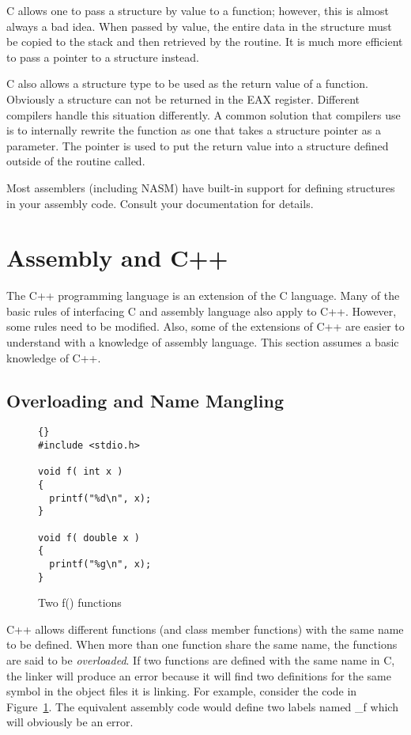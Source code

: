 C allows one to pass a structure by value to a function; however, this is
almost always a bad idea. When passed by value, the entire data in the
structure must be copied to the stack and then retrieved by the routine.
It is much more efficient to pass a pointer to a structure instead.

C also allows a structure type to be used as the return value of a function.
Obviously a structure can not be returned in the {\code EAX} register. Different
compilers handle this situation differently. A common solution that compilers
use is to internally rewrite the function as one that takes a structure pointer
as a parameter. The pointer is used to put the return value into a structure
defined outside of the routine called.

Most assemblers (including NASM) have built-in support for defining structures
in your assembly code. Consult your documentation for details.



\section{Assembly and C++}

The C++ programming language is an extension of the C language. Many of the
basic rules of interfacing C and assembly language also apply to C++.
However, some rules need to be modified. Also, some of the extensions
of C++ are easier to understand with a knowledge of assembly language.
This section assumes a basic knowledge of C++.

\subsection{Overloading and Name Mangling}
\label{subsec:mangling}
\begin{figure}
\centering
\begin{lstlisting}[frame=tlrb]{}
#include <stdio.h>

void f( int x )
{
  printf("%d\n", x);
}

void f( double x )
{
  printf("%g\n", x);
}
\end{lstlisting}
\caption{Two {\code f()} functions \label{fig:twof}}
\end{figure}

C++ allows different functions (and class member functions) with the same
name to be defined. When more than one function share the same name, the
functions are said to be \emph{overloaded}. If two functions are defined
with the same name in C, the linker will produce an error because it will
find two definitions for the same symbol in the object files it is linking.
For example, consider the code in Figure~\ref{fig:twof}. The equivalent
assembly code would define two labels named {\code \_f} which will obviously
be an error.

